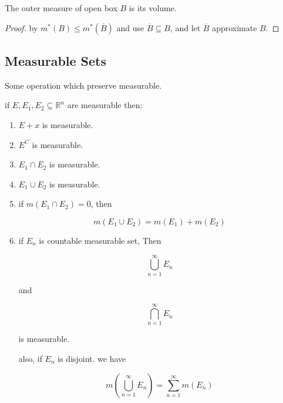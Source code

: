 \begin{corollary}
    The outer measure of open box $B$ is its volume.
\end{corollary}

\begin{proof}
    by $m^*(B) \le m^*(\overline{B})$ and use $\overline{B} \subseteq B$, and 
    let $\overline{B}$ approximate $B$.
\end{proof}


\subsection{Measurable Sets}

\begin{thm}
    Some operation which preserve measurable.

    if $E,E_1, E_2\subseteq \mathbb{R}^n$ are measurable then:

    \begin{enumerate}
        \item $E + x$ is measurable.

        \item $E^C$ is measurable.

        \item $E_1 \cap E_2$ is measurable.

        \item $E_1 \cup E_2$ is measurable.

        \item if $m(E_1 \cap E_2) = 0$, then

        \[
            m(E_1 \cup E_2) = m(E_1) + m(E_2)
        \]

        \item if $E_n$ is countable measurable set, Then

        \[
            \bigcup_{n=1}^{\infty}E_n
        \]

        and


        \[
            \bigcap_{n=1}^{\infty}E_n
        \]

        is measurable.

        also, if $E_n$ is disjoint. we have

        \[
            m(\bigcup_{n=1}^{\infty}E_n) = \sum_{n=1}^{\infty}m(E_n)
        \]
    \end{enumerate}
\end{thm}

